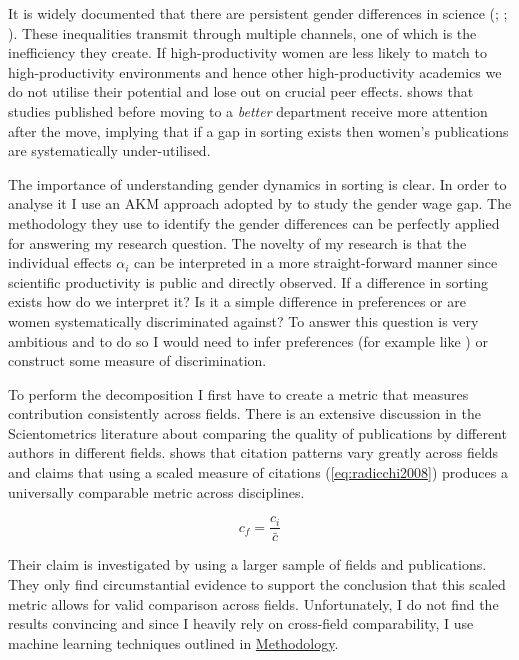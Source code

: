 \documentclass[10pt]{report}
\begin{document}
It is widely documented that there are persistent gender differences in science (\cite{Gasser2014}; \cite{Lariviere2013}; \cite{Iaria2022}). These inequalities transmit through multiple channels, one of which is the inefficiency they create. If high-productivity women are less likely to match to high-productivity environments and hence other high-productivity academics we do not utilise their potential and lose out on crucial peer effects. \textcite{Ganguli2015} shows that studies published before moving to a \textit{better} department receive more attention after the move, implying that if a gap in sorting exists then women's publications are systematically under-utilised.

The importance of understanding gender dynamics in sorting is clear. In order to analyse it I use an AKM approach adopted by \textcite{Card2016} to study the gender wage gap. The methodology they use to identify the gender differences can be perfectly applied for answering my research question. The novelty of my research is that the individual effects \(\alpha_i\) can be interpreted in a more straight-forward manner since scientific productivity is public and directly observed. If a difference in sorting exists how do we interpret it? Is it a simple difference in preferences or are women systematically discriminated against? To answer this question is very ambitious and to do so I would need to infer preferences (for example like \cite{Sorkin2017}) or construct some measure of discrimination.

To perform the decomposition I first have to create a metric that measures contribution consistently across fields. There is an extensive discussion in the Scientometrics literature about comparing the quality of publications by different authors in different fields.
\textcite{Radicchi2008} shows that citation patterns vary greatly across fields and claims that using a scaled measure of citations (\autoref{eq:radicchi2008}) produces a universally comparable metric across disciplines.

\begin{equation}
    \label{eq:radicchi2008}
    c_f = \frac{c_i}{\bar{c}}
\end{equation}

Their claim is investigated by \textcite{Waltman2012} using a larger sample of fields and publications. They only find circumstantial evidence to support the conclusion that this scaled metric allows for valid comparison across fields. Unfortunately, I do not find the results convincing and since I heavily rely on cross-field comparability, I use machine learning techniques outlined in \hyperref[sec:method]{Methodology}.
\end{document}
